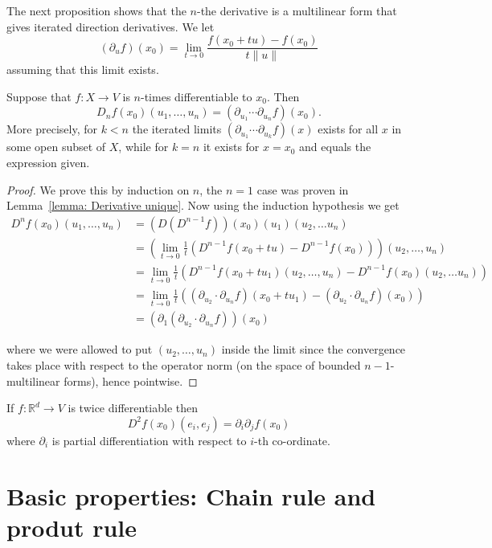 \documentclass[twoside, a4paper, 10pt]{amsart}
\begin{document}
The next proposition shows that the $n$-the derivative is a multilinear form that gives iterated direction derivatives. We let $$(\partial_{u}f)(x_0) = \lim_{t \to 0} \frac{f(x_0+tu) - f(x_0)}{t \|u \|} $$ assuming that this limit exists.

\begin{prop} Suppose that $f:X \to V$ is $n$-times differentiable to $x_0$. Then $$D_n f (x_0)(u_1, \ldots, u_n) = (\partial_{u_1} \cdots \partial_{u_n} f) (x_0).$$ More precisely, for $k<n$ the iterated limits $(\partial_{u_1} \cdots \partial_{u_k}f) (x)$ exists for all $x$ in some open subset of $X$, while for $k=n$ it exists for $x=x_0$ and equals the expression given.

\end{prop}

\begin{proof} We prove this by induction on $n$, the $n=1$ case was proven in Lemma~\ref{lemma: Derivative unique}. Now using the induction hypothesis we get
\begin{align*} 
D^nf(x_0)(u_1, \ldots, u_n) &= \left( D(D^{n-1}f) \right) (x_0)(u_1)(u_2, \ldots u_n) \\ 
&= \left( \lim_{t \to 0} \frac{1}{t} \left(D^{n-1}f(x_0+tu) - D^{n-1}f(x_0) \right) \right) (u_2, \ldots, u_n) \\
&= \lim_{t \to 0} \frac{1}{t} \left(D^{n-1}f(x_0+tu_1)(u_2, \ldots, u_n) - D^{n-1}f(x_0)(u_2, \ldots u_n) \right)\\
&=\lim_{t \to 0} \frac{1}{t} \left( (\partial_{u_2} \cdot \partial_{u_n}f)(x_0+tu_1) - (\partial_{u_2} \cdot \partial_{u_n}f)(x_0)  \right) \\
&= (\partial_1(\partial_{u_2} \cdot \partial_{u_n}f)) (x_0)
\end{align*}

where we were allowed to put $(u_2, \ldots, u_n)$ inside the limit since the convergence takes place with respect to the operator norm (on the space of bounded $n-1$-multilinear forms), hence pointwise. \end{proof}

\begin{corol}\label{corol: second derivative is iterated derivative} If $f: \mathbb{R}^d \to V$ is twice differentiable then $$ D^2 f (x_0) (e_i, e_j) = \partial_i \partial_j f(x_0)$$ where $\partial_i$ is partial differentiation with respect to $i$-th co-ordinate. \end{corol}

\section{Basic properties: Chain rule and produt rule}
\end{document}
